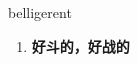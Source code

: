 
\begin{frame}
{\huge belligerent}
\begin{center}
\begin{enumerate}\Large
  \item \textbf{好斗的，好战的}
\end{enumerate}
\end{center}
\end{frame}
